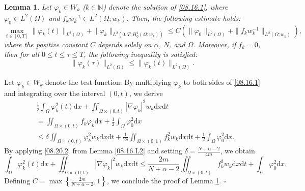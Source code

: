 \documentclass[11pt]{article}
\newtheorem{lemma}{Lemma}[section]
\newenvironment{proof}{{\bf {Proof.}}}{\hfill $\square$}
\numberwithin{equation}{section}
\def\bf{\textbf}
\begin{document}
  \begin{lemma}\label{08.22.L1}
Let $\varphi_k \in W_k$ ($k \in \mathbb{N}$) denote the solution of \eqref{08.16.1}, where $\varphi_0 \in L^2(\Omega)$ and $f_k w_k^{-1} \in L^2(\Omega; w_k)$. Then, the following estimate holds:
\begin{equation*}
\max_{t \in [0,T]} \|\varphi_k(t)\|_{L^2(\Omega)} + \|\varphi_k\|_{L^2(0,T; H_0^1(\Omega; w_k))} \leq C \left( \|\varphi_0\|_{L^2(\Omega)} + \|f_k w_k^{-1}\|_{L^2(\Omega; w_k)} \right),
\end{equation*}
where the positive constant $C$ depends solely on $\alpha$, $N$, and $\Omega$.
Moreover, if $f_k = 0$, then for all $0 \leq t \leq \tau \leq T$, the following inequality is satisfied:
\begin{equation*}
\|\varphi_k(\tau)\|_{L^2(\Omega)} \leq \|\varphi_k(t)\|_{L^2(\Omega)}.
\end{equation*}
\end{lemma}
 \begin{proof}
Let $\varphi_k \in W_k$ denote the test function. By multiplying $\varphi_k$ to both sides of \eqref{08.16.1} and integrating over the interval $(0,t)$, we derive
\begin{equation*}
\begin{split}
&\frac{1}{2}\int_\Omega \varphi_k^2(t)\mathrm{d} x + \iint_{\Omega\times (0,t)} |\nabla\varphi_k|^2w_k\mathrm{d} x\mathrm{d} t \\
&= \iint_{\Omega\times (0,t)} f_k\varphi_k\mathrm{d} x + \frac{1}{2}\int_\Omega \varphi_0^2\mathrm{d} x \\
&\leq \delta \iint_{\Omega\times (0,t)} \varphi_k^2w_k\mathrm{d} x\mathrm{d} t + \frac{1}{2\delta}\iint_{\Omega\times (0,1)} f_k^2w_k\mathrm{d} x\mathrm{d} t + \frac{1}{2}\int_\Omega \varphi_0^2\mathrm{d} x.
\end{split}
\end{equation*}
By applying \eqref{08.20.2} from Lemma \ref{08.16.L2} and setting $\delta = \frac{N+\alpha-2}{4m}$, we obtain
\begin{equation*}
\int_\Omega \varphi_k^2(t)\mathrm{d} x + \iint_{\Omega\times (0,t)} |\nabla\varphi_k|^2w_k\mathrm{d} x\mathrm{d} t \leq \frac{2m}{N+\alpha-2}\iint_{\Omega\times (0,t)} f_k^2w_k\mathrm{d} x\mathrm{d} t + \int_\Omega \varphi_0^2\mathrm{d} x.
\end{equation*}
Defining $C = \max\left\{\frac{2m}{N+\alpha-2}, 1\right\}$, we conclude the proof of Lemma \ref{08.22.L1}.
\end{proof}
\end{document}
